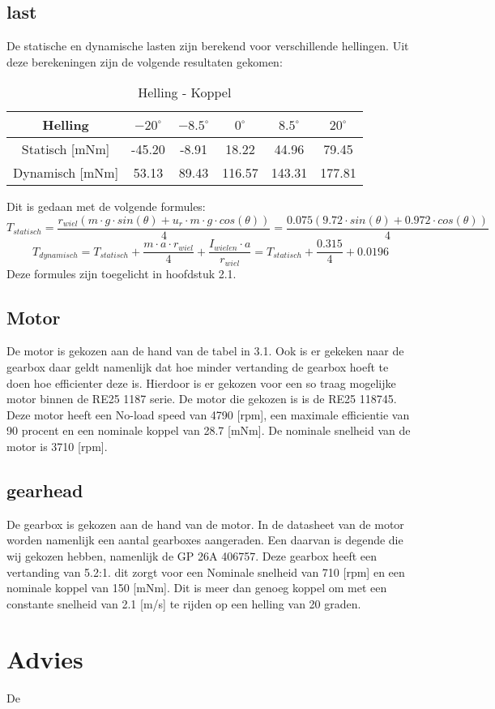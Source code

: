 \documentclass{article}
\begin{document}
    \subsection{last}
    De statische en dynamische lasten zijn berekend voor verschillende hellingen. 
    Uit deze berekeningen zijn de volgende resultaten gekomen: 

        \begin{table}[h]
            \centering
            \begin{tabular}{|c|c|c|c|c|c|}
            \hline
            Helling & $-20 ^\circ$ & $-8.5 ^\circ$ & $0 ^\circ$ & $8.5 ^\circ$ & $20 ^\circ$ \\ \hline
            Statisch [mNm]  & -45.20   & -8.91   & 18.22   & 44.96  & 79.45   \\ \hline
            Dynamisch [mNm]  & 53.13  & 89.43   & 116.57  & 143.31  & 177.81  \\ \hline
            \end{tabular}
            \caption{Helling - Koppel}
            \label{tab}
        \end{table}
        Dit is gedaan met de volgende formules:
        $$T_{statisch} = \frac{r_{wiel}(m \cdot g \cdot sin(\theta) + u_r \cdot m \cdot g \cdot cos(\theta))}{4} = \frac{0.075(9.72 \cdot sin(\theta) +  0.972 \cdot cos(\theta))}{4}$$
        $$T_{dynamisch} = T_{statisch} + \frac{m \cdot a \cdot r_{wiel}}{4} + \frac{I_{wielen} \cdot a}{r_{wiel}} = T_{statisch} + \frac{0.315}{4}+ 0.0196 $$
        Deze formules zijn toegelicht in hoofdstuk 2.1.
        
    \subsection{Motor}
    De motor is gekozen aan de hand van de tabel in 3.1. 
    Ook is er gekeken naar de gearbox daar geldt namenlijk dat hoe minder vertanding de gearbox hoeft te doen hoe efficienter deze is. 
    Hierdoor is er gekozen voor een so traag mogelijke motor binnen de RE25 1187 serie.
    De motor die gekozen is is de RE25 118745. 
    Deze motor heeft een No-load speed van 4790 [rpm], een maximale efficientie van 90 procent en een nominale koppel van 28.7 [mNm].
    De nominale snelheid van de motor is 3710 [rpm].
    

    \subsection{gearhead}
    De gearbox is gekozen aan de hand van de motor. 
    In de datasheet van de motor worden namenlijk een aantal gearboxes aangeraden.
    Een daarvan is degende die wij gekozen hebben, namenlijk de GP 26A 406757. 
    Deze gearbox heeft een vertanding van 5.2:1. dit zorgt voor een Nominale snelheid van 710 [rpm] en een nominale koppel van 150 [mNm]. 
    Dit is meer dan genoeg koppel om met een constante snelheid van 2.1 [m/s] te rijden op een helling van 20 graden.

\section{Advies}
    De


\clearpage
\appendix


\end{document}

